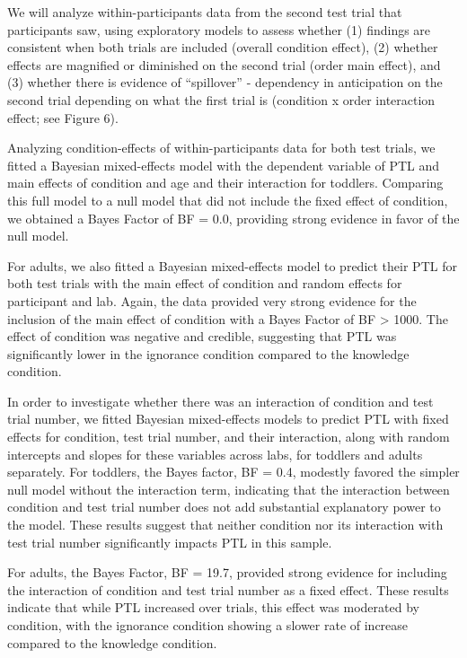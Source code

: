 \documentclass[
  man,floatsintext]{apa6}
\begin{document}
We will analyze within-participants data from the second test trial that participants saw, using exploratory models to assess whether (1) findings are consistent when both trials are included (overall condition effect), (2) whether effects are magnified or diminished on the second trial (order main effect), and (3) whether there is evidence of ``spillover'' - dependency in anticipation on the second trial depending on what the first trial is (condition x order interaction effect; see Figure 6).

Analyzing condition-effects of within-participants data for both test trials, we fitted a Bayesian mixed-effects model with the dependent variable of PTL and main effects of condition and age and their interaction for toddlers. Comparing this full model to a null model that did not include the fixed effect of condition, we obtained a Bayes Factor of BF = 0.0, providing
strong evidence in favor of the null model.

For adults, we also fitted a Bayesian mixed-effects model to predict their PTL for both test trials with the main effect of condition and random effects for participant and lab. Again, the data provided very strong evidence for the inclusion of the main effect of condition with a Bayes Factor of BF \textgreater{} 1000. The effect of condition was negative and credible, suggesting that PTL was significantly lower in the ignorance condition compared to the knowledge condition.

In order to investigate whether there was an interaction of condition and test trial number, we fitted Bayesian mixed-effects models to predict PTL with fixed effects for condition, test trial number, and their interaction, along with random intercepts and slopes for these variables across labs, for toddlers and adults separately. For toddlers, the Bayes factor, BF = 0.4, modestly favored the simpler null model without the interaction term, indicating that the interaction between condition and test trial number does not add substantial explanatory power to the model. These results suggest that neither condition nor its interaction with test trial number significantly impacts PTL in this sample.

For adults, the Bayes Factor, BF = 19.7, provided strong evidence for including the interaction of condition and test trial number as a fixed effect. These results indicate that while PTL increased over trials, this effect was moderated by condition, with the ignorance condition showing a slower rate of increase compared to the knowledge condition.
\end{document}
